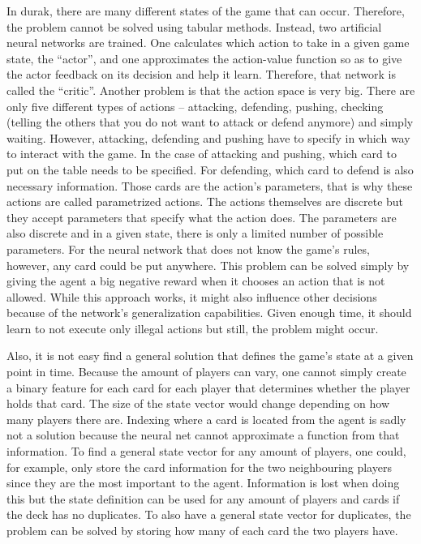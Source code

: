 \documentclass[a4paper,titlepage]{article}
\begin{document}
\label{sec:challenges}
In durak, there are many different states of the game that can occur. Therefore, the problem cannot be solved using tabular methods. Instead, two artificial neural networks are trained. One calculates which action to take in a given game state, the ``actor'', and one approximates the action-value function so as to give the actor feedback on its decision and help it learn. Therefore, that network is called the ``critic''.
Another problem is that the action space is very big. There are only five different types of actions -- attacking, defending, pushing, checking (telling the others that you do not want to attack or defend anymore) and simply waiting. However, attacking, defending and pushing have to specify in which way to interact with the game. In the case of attacking and pushing, which card to put on the table needs to be specified. For defending, which card to defend is also necessary information. Those cards are the action's parameters, that is why these actions are called parametrized actions. The actions themselves are discrete but they accept parameters that specify what the action does. The parameters are also discrete and in a given state, there is only a limited number of possible parameters. For the neural network that does not know the game's rules, however, any card could be put anywhere. This problem can be solved simply by giving the agent a big negative reward when it chooses an action that is not allowed. While this approach works, it might also influence other decisions because of the network's generalization capabilities. Given enough time, it should learn to not execute only illegal actions but still, the problem might occur.

Also, it is not easy find a general solution that defines the game's state at a given point in time. Because the amount of players can vary, one cannot simply create a binary feature for each card for each player that determines whether the player holds that card. The size of the state vector would change depending on how many players there are. Indexing where a card is located from the agent is sadly not a solution because the neural net cannot approximate a function from that information. %
To find a general state vector for any amount of players, one could, for example, only store the card information for the two neighbouring players since they are the most important to the agent. Information is lost when doing this but the state definition can be used for any amount of players and cards if the deck has no duplicates. To also have a general state vector for duplicates, the problem can be solved by storing how many of each card the two players have.
\end{document}
